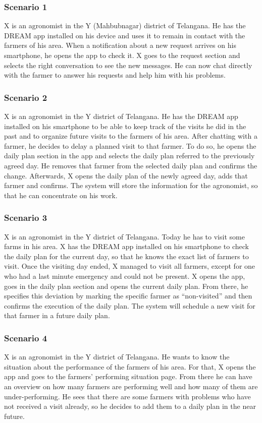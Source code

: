 \subsubsection*{Scenario 1}
X is an agronomist in the Y (Mahbubnagar) district of Telangana. He has the DREAM app installed on his device and uses it to remain in contact with the farmers of his area. When a notification about a new request arrives on his smartphone, he opens the app to check it. X goes to the request section and selects the right conversation to see the new messages. He can now chat directly with the farmer to answer his requests and help him with his problems.

\subsubsection*{Scenario 2}
X is an agronomist in the Y district of Telangana. He has the DREAM app installed on his smartphone to be able to keep track of the visits he did in the past and to organize future visits to the farmers of his area. After chatting with a farmer, he decides to delay a planned visit to that farmer. To do so, he opens the daily plan section in the app and selects the daily plan referred to the previously agreed day. He removes that farmer from the selected daily plan and confirms the change. Afterwards, X opens the daily plan of the newly agreed day, adds that farmer and confirms. The system will store the information for the agronomist, so that he can concentrate on his work.



\subsubsection*{Scenario 3}
X is an agronomist in the Y district of Telangana. Today he has to visit some farms in his area. X has the DREAM app installed on his smartphone to check the daily plan for the current day, so that he knows the exact list of farmers to visit. Once the visiting day ended, X managed to visit all farmers, except for one who had a last minute emergency and could not be present. X opens the app, goes in the daily plan section and opens the current daily plan. From there, he specifies this deviation by marking the specific farmer as “non-visited” and then confirms the execution of the daily plan. The system will schedule a new visit for that farmer in a future daily plan.

\subsubsection*{Scenario 4}
X is an agronomist in the Y district of Telangana. He wants to know the situation about the performance of the farmers of his area. For that, X opens the app and goes to the farmers’ performing situation page. From there he can have an overview on how many farmers are performing well and how many of them are under-performing. He sees that there are some farmers with problems who have not received a visit already, so he decides to add them to a daily plan in the near future.

